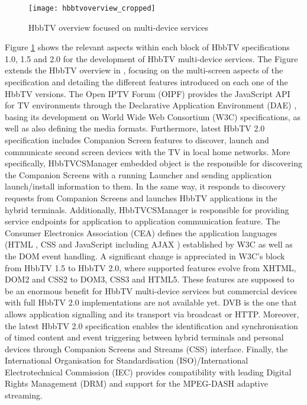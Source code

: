 \begin{figure}
	\texttt{[image: hbbtvoverview\_cropped]}
	\caption{HbbTV overview focused on multi-device services}
	\label{fig:hbbtvoverview}
\end{figure}

Figure \ref{fig:hbbtvoverview} shows the relevant aspects within each block of HbbTV specifications 1.0, 1.5 and 2.0 for the development of HbbTV multi-device services. The Figure extends the HbbTV overview in \cite{hbbtvWeb}, focusing on the multi-screen aspects of the specification and detailing the different features introduced on each one of the HbbTV versions. The Open IPTV Forum (OIPF) \cite{oipf} provides the JavaScript API for TV environments through the Declarative Application Environment (DAE) \cite{DAE}, basing its development on World Wide Web Consortium (W3C) \cite{w3c} specifications, as well as also defining the media formats. Furthermore, latest HbbTV 2.0 specification includes Companion Screen features to discover, launch and communicate second screen devices with the TV in local home networks. More specifically, HbbTVCSManager embedded object is the responsible for discovering the Companion Screens with a running Launcher and sending application launch/install information to them. In the same way, it responds to discovery requests from Companion Screens and launches HbbTV applications in the hybrid terminals. Additionally,  HbbTVCSManager is responsible for providing service endpoints for application to application communication feature. The Consumer Electronics Association (CEA) \cite{cea} defines the application languages (HTML \cite{html}, CSS \cite{css} and JavaScript \cite{js} including AJAX \cite{ajax}) established by W3C as well as the DOM \cite{dom} event handling. A significant change is appreciated in W3C's block from HbbTV 1.5 to HbbTV 2.0, where supported features evolve from XHTML, DOM2 and CSS2 to DOM3, CSS3 and HTML5. These features are supposed to be an enormous benefit for HbbTV multi-device services but commercial devices with full HbbTV 2.0 implementations are not available yet. DVB \cite{DVBstandards} is the one that allows application signalling and its transport via broadcast or HTTP. Moreover, the latest HbbTV 2.0 specification enables the identification and synchronisation of timed content and event triggering between hybrid terminals and personal devices through Companion Screens and Streams (CSS) interface. Finally, the International Organisation for Standardisation (ISO)/International Electrotechnical Commission (IEC) \cite{iso} \cite{iec} provides compatibility with leading Digital Rights Management (DRM) and support for the MPEG-DASH \cite{dash} adaptive streaming.

